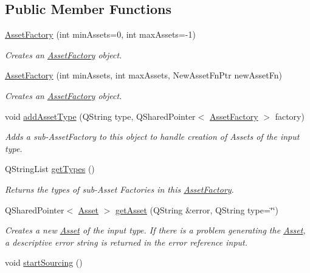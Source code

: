 \subsection*{Public Member Functions}
\begin{DoxyCompactItemize}
\item 
\hyperlink{class_picto_1_1_asset_factory_a7793f11cc1eadad399a9788d58187dce}{Asset\-Factory} (int min\-Assets=0, int max\-Assets=-\/1)
\begin{DoxyCompactList}\small\item\em Creates an \hyperlink{class_picto_1_1_asset_factory}{Asset\-Factory} object. \end{DoxyCompactList}\item 
\hyperlink{class_picto_1_1_asset_factory_af7ea55335f831b93e872d77a57c29d9b}{Asset\-Factory} (int min\-Assets, int max\-Assets, New\-Asset\-Fn\-Ptr new\-Asset\-Fn)
\begin{DoxyCompactList}\small\item\em Creates an \hyperlink{class_picto_1_1_asset_factory}{Asset\-Factory} object. \end{DoxyCompactList}\item 
void \hyperlink{class_picto_1_1_asset_factory_a682f965c48d41064f9f13c9ab75a984e}{add\-Asset\-Type} (Q\-String type, Q\-Shared\-Pointer$<$ \hyperlink{class_picto_1_1_asset_factory}{Asset\-Factory} $>$ factory)
\begin{DoxyCompactList}\small\item\em Adds a sub-\/\-Asset\-Factory to this object to handle creation of Assets of the input type. \end{DoxyCompactList}\item 
Q\-String\-List \hyperlink{class_picto_1_1_asset_factory_ad2a245af2e1cfb33f9acdd8f1466e62a}{get\-Types} ()
\begin{DoxyCompactList}\small\item\em Returns the types of sub-\/\-Asset Factories in this \hyperlink{class_picto_1_1_asset_factory}{Asset\-Factory}. \end{DoxyCompactList}\item 
Q\-Shared\-Pointer$<$ \hyperlink{class_picto_1_1_asset}{Asset} $>$ \hyperlink{class_picto_1_1_asset_factory_a1d13b02e964d37012d2b02e0fa940969}{get\-Asset} (Q\-String \&error, Q\-String type=\char`\"{}\char`\"{})
\begin{DoxyCompactList}\small\item\em Creates a new \hyperlink{class_picto_1_1_asset}{Asset} of the input type. If there is a problem generating the \hyperlink{class_picto_1_1_asset}{Asset}, a descriptive error string is returned in the error reference input. \end{DoxyCompactList}\item 
\hypertarget{class_picto_1_1_asset_factory_a32c8377f0613a103f295470fb8b8aa8e}{void \hyperlink{class_picto_1_1_asset_factory_a32c8377f0613a103f295470fb8b8aa8e}{start\-Sourcing} ()}\label{class_picto_1_1_asset_factory_a32c8377f0613a103f295470fb8b8aa8e}


\end{DoxyCompactItemize}
